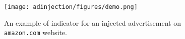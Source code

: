 \begin{figure}[!t]
    \centering
    \texttt{[image: adinjection/figures/demo.png]}
    \caption{An example of indicator for an injected advertisement on \texttt{amazon.com} website.}
    \label{adinjection:fig:indicator}
\end{figure}
